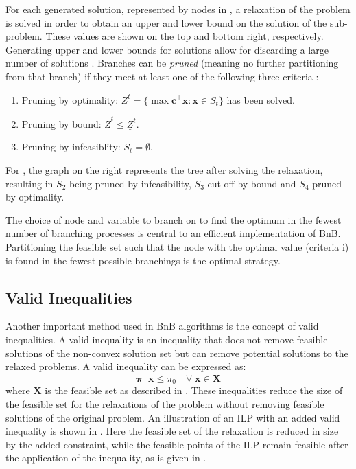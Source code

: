 For each generated solution, represented by nodes in , a relaxation of the problem is solved in order to obtain an upper and lower bound on the solution of the sub-problem. 
These values are shown on the top and bottom right, respectively. 
Generating upper and lower bounds for solutions allow for discarding a large number of solutions \cite{wolsey2020integer}. Branches can be \textit{pruned} (meaning no further partitioning from that branch) if they meet at least one of the following three criteria \cite{wolsey2020integer}:
\newpage
\begin{enumerate}[label=(\roman*)]
    \item Pruning by optimality: $Z^t = \{\max \bm{c}^{\top} \bm{x} : \bm{x} \in S_t\}$ has been solved.
    \item Pruning by bound: $\overline{Z}^t \leq \underline{Z}^t$.
    \item Pruning by infeasiblity: $S_t = \emptyset $.
\end{enumerate}
For , the graph on the right represents the tree after solving the relaxation, resulting in $S_2$ being pruned by infeasibility, $S_3$ cut off by bound and $S_4$ pruned by optimality.


The choice of node and variable to branch on to find the optimum in the fewest number of branching processes is central to an efficient implementation of \gls{BnB}. Partitioning the feasible set such that the node with the optimal value (criteria i) is found in the fewest possible branchings is the optimal strategy. 


\subsection{Valid Inequalities}\label{ssec:inequalities}

Another important method used in \gls{BnB} algorithms is the concept of valid inequalities. A valid inequality is an inequality that does not remove feasible solutions of the non-convex solution set but can remove potential solutions to the relaxed problems. A valid inequality can be expressed as:
\begin{equation}\label{eq:cut}
    \bm{\pi}^{\top} \bm{x} \leq \pi_0 \quad \forall \; \mathbf{x} \in  \bm{X}   
\end{equation}
where $\bm{X}$ is the feasible set as described in . These inequalities reduce the size of the feasible set for the relaxations of the problem without removing feasible solutions of the original problem. An illustration of an \gls{ILP} with an added valid inequality is shown in . Here the feasible set of the relaxation is reduced in size by the added constraint, while the feasible points of the \gls{ILP} remain feasible after the application of the inequality, as is given in .

